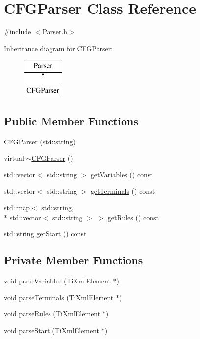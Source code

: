 \hypertarget{classCFGParser}{\section{C\-F\-G\-Parser Class Reference}
\label{classCFGParser}
}


{\ttfamily \#include $<$Parser.\-h$>$}

Inheritance diagram for C\-F\-G\-Parser\-:\begin{figure}[H]
\begin{center}
\leavevmode
\includegraphics[height=2.000000cm]{da/d24/classCFGParser}
\end{center}
\end{figure}
\subsection*{Public Member Functions}
\begin{DoxyCompactItemize}
\item 
\hyperlink{classCFGParser_ab92c03dd2a8d901fb38b468c97ee879d}{C\-F\-G\-Parser} (std\-::string)
\item 
virtual \hyperlink{classCFGParser_a52b7730ad87bfb47fcc100dc6b2756ee}{$\sim$\-C\-F\-G\-Parser} ()
\item 
std\-::vector$<$ std\-::string $>$ \hyperlink{classCFGParser_a91c3dfa2ce514b1066eb4d86af311804}{get\-Variables} () const 
\item 
std\-::vector$<$ std\-::string $>$ \hyperlink{classCFGParser_aef1d5758fe648f2ab93220816bdd9a84}{get\-Terminals} () const 
\item 
std\-::map$<$ std\-::string, \\*
std\-::vector$<$ std\-::string $>$ $>$ \hyperlink{classCFGParser_abf6237f25b52dd05009220a8d10c3449}{get\-Rules} () const 
\item 
std\-::string \hyperlink{classCFGParser_af4336389c220320c7d9511fffafddfae}{get\-Start} () const 
\end{DoxyCompactItemize}
\subsection*{Private Member Functions}
\begin{DoxyCompactItemize}
\item 
void \hyperlink{classCFGParser_ad743c15b7790fcd172b8a1ef7ece1473}{parse\-Variables} (Ti\-Xml\-Element $\ast$)
\item 
void \hyperlink{classCFGParser_a525642f6ee69770c435e855e0609fa32}{parse\-Terminals} (Ti\-Xml\-Element $\ast$)
\item 
void \hyperlink{classCFGParser_a681f962f987adf57ba9ff8b3638fef14}{parse\-Rules} (Ti\-Xml\-Element $\ast$)
\item 
void \hyperlink{classCFGParser_a1ca52cabb5cf726a0eb7a2668c3c0a5a}{parse\-Start} (Ti\-Xml\-Element $\ast$)
\end{DoxyCompactItemize}
